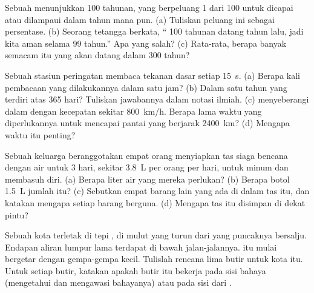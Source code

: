 \begin{exercise}[$\star\star$]\label{exo:g9:natural-risks:9}
Sebuah   menunjukkan  100 tahunan, yang berpeluang 1 dari
100 untuk dicapai atau dilampaui dalam tahun mana pun. (a) Tuliskan
peluang ini sebagai persentase. (b) Seorang tetangga berkata, `` 100
tahunan datang tahun lalu, jadi kita aman selama 99 tahun.'' Apa yang
salah? (c) Rata-rata, berapa banyak  semacam itu yang akan datang
dalam 300 tahun?
\end{exercise}

\begin{exercise}[$\star\star$]\label{exo:g9:natural-risks:10}
Sebuah stasiun peringatan  membaca tekanan dasar  setiap
\qty{15}{s}. (a) Berapa kali pembacaan yang dilakukannya dalam satu jam?
(b) Dalam satu tahun yang terdiri atas 365 hari? Tuliskan jawabannya dalam
notasi ilmiah. (c)  menyeberangi  dalam dengan kecepatan
sekitar \qty{800}{km/h}. Berapa lama waktu yang diperlukannya untuk
mencapai pantai yang berjarak \qty{2400}{km}? (d) Mengapa waktu itu
penting?
\end{exercise}

\begin{exercise}[$\star\star\star$]\label{exo:g9:natural-risks:11}
Sebuah keluarga beranggotakan empat orang menyiapkan tas siaga bencana
dengan air untuk 3 hari, sekitar \qty{3.8}{L} per orang per hari, untuk
minum dan membasuh diri. (a) Berapa liter air yang mereka perlukan?
(b) Berapa botol \qty{1.5}{L} jumlah itu? (c) Sebutkan empat barang lain
yang ada di dalam tas itu, dan katakan mengapa setiap barang berguna.
(d) Mengapa tas itu disimpan di dekat pintu?
\end{exercise}

\begin{exercise}[$\star\star\star$]\label{exo:g9:natural-risks:12}
Sebuah kota terletak di tepi , di mulut  yang turun dari
 yang puncaknya bersalju. Endapan aliran lumpur lama terdapat di
bawah jalan-jalannya.  itu mulai bergetar dengan gempa-gempa
kecil. Tulislah rencana  lima butir untuk kota itu. Untuk
setiap butir, katakan apakah butir itu bekerja pada sisi bahaya
(mengetahui dan mengawasi bahayanya) atau pada sisi  dari
.
\end{exercise}

